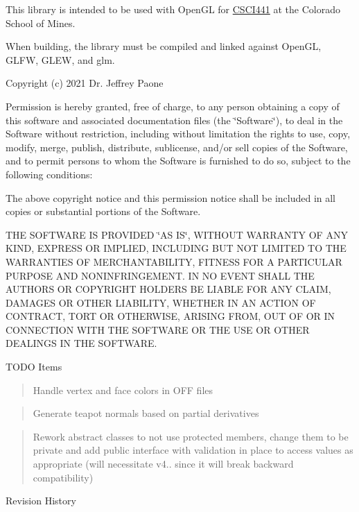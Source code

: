 This library is intended to be used with Open\+GL for \mbox{\hyperlink{namespace_c_s_c_i441}{CSCI441}} at the Colorado School of Mines.

When building, the library must be compiled and linked against Open\+GL, GLFW, GLEW, and glm. ~\newline


Copyright (c) 2021 Dr. Jeffrey Paone

Permission is hereby granted, free of charge, to any person obtaining a copy of this software and associated documentation files (the \char`\"{}\+Software\char`\"{}), to deal in the Software without restriction, including without limitation the rights to use, copy, modify, merge, publish, distribute, sublicense, and/or sell copies of the Software, and to permit persons to whom the Software is furnished to do so, subject to the following conditions\+:

The above copyright notice and this permission notice shall be included in all copies or substantial portions of the Software.

THE SOFTWARE IS PROVIDED \char`\"{}\+AS IS\char`\"{}, WITHOUT WARRANTY OF ANY KIND, EXPRESS OR IMPLIED, INCLUDING BUT NOT LIMITED TO THE WARRANTIES OF MERCHANTABILITY, FITNESS FOR A PARTICULAR PURPOSE AND NONINFRINGEMENT. IN NO EVENT SHALL THE AUTHORS OR COPYRIGHT HOLDERS BE LIABLE FOR ANY CLAIM, DAMAGES OR OTHER LIABILITY, WHETHER IN AN ACTION OF CONTRACT, TORT OR OTHERWISE, ARISING FROM, OUT OF OR IN CONNECTION WITH THE SOFTWARE OR THE USE OR OTHER DEALINGS IN THE SOFTWARE.

TODO Items \begin{quote}
Handle vertex and face colors in OFF files \end{quote}
\begin{quote}
Generate teapot normals based on partial derivatives \end{quote}
\begin{quote}
Rework abstract classes to not use protected members, change them to be private and add public interface with validation in place to access values as appropriate (will necessitate v4.. since it will break backward compatibility) \end{quote}
Revision History

